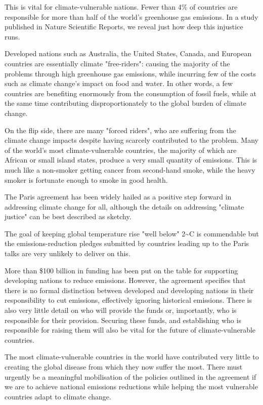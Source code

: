 \documentclass[UTF8,11pt]{ctexart}
\begin{document}
This is vital for climate-vulnerable nations. Fewer than 4\% of countries are responsible for more than half of the world's greenhouse gas emissions. In a study published in Nature Scientific Reports, we reveal just how deep this injustice runs.


Developed nations such as Australia, the United States, Canada, and European countries are essentially climate "free-riders": causing the majority of the problems through high greenhouse gas emissions, while incurring few of the costs such as climate change's impact on food and water. In other words, a few countries are benefiting enormously from the consumption of fossil fuels, while at the same time contributing disproportionately to the global burden of climate change.


On the flip side, there are many "forced riders", who are suffering from the climate change impacts despite having scarcely contributed to the problem. Many of the world's most climate-vulnerable countries, the majority of which are African or small island states, produce a very small quantity of emissions. This is much like a non-smoker getting cancer from second-hand smoke, while the heavy smoker is fortunate enough to smoke in good health.


The Paris agreement has been widely hailed as a positive step forward in addressing climate change for all, although the details on addressing "climate justice" can be best described as sketchy.


The goal of keeping global temperature rise "well below" 2\textasciitilde{}C is commendable but the emissions-reduction pledges submitted by countries leading up to the Paris talks are very unlikely to deliver on this.


More than \$100 billion in funding has been put on the table for supporting developing nations to reduce emissions. However, the agreement specifies that there is no formal distinction between developed and developing nations in their responsibility to cut emissions, effectively ignoring historical emissions. There is also very little detail on who will provide the funds or, importantly, who is responsible for their provision. Securing these funds, and establishing who is responsible for raising them will also be vital for the future of climate-vulnerable countries.


The most climate-vulnerable countries in the world have contributed very little to creating the global disease from which they now suffer the most. There must urgently be a meaningful mobilisation of the policies outlined in the agreement if we are to achieve national emissions reductions while helping the most vulnerable countries adapt to climate change.
\end{document}
